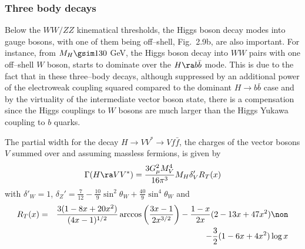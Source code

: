 \subsubsection{Three body decays} 

Below the $WW/ZZ$ kinematical thresholds, the Higgs boson decay modes into
gauge bosons, with one of them being off--shell, Fig.~2.9b, are also important.
For instance, from $M_{H}  \gsim 130$ GeV, the Higgs  boson decay into  $WW$
pairs with one off--shell $W$ boson, starts to dominate over the  $H \ra
b\bar{b}$ mode.  This is due to the fact that in these three--body decays,
although suppressed by an additional power of the  electroweak coupling squared
compared to the dominant $H \to b\bar{b}$ case and by the virtuality of the
intermediate vector boson state,  there is a compensation since the Higgs
couplings to $W$ bosons are much larger than the Higgs Yukawa coupling to $b$
quarks.\s

The partial width for the decay $H \to VV^* \to V f\bar{f}$, the charges of the
vector bosons $V$ summed over and assuming massless fermions, is given by 
\cite{HVV-3body}
\begin{eqnarray} 
\Gamma (H \ra VV^*) = \frac{3 G_\mu^2 M_V^4}{16 \pi^3} M_H \delta_V' R_T(x) 
\label{HVV-3body}
\end{eqnarray} 
with $\delta'_W=1$, $\delta_Z' = \frac{7}{12} - \frac{10}{9}
\sin^2\theta_W+ \frac{40}{9}\sin^4\theta_W$ and 
\begin{eqnarray}
R_T(x) & = & \frac{3(1-8x+20x^2)}{(4x-1)^{1/2}} \arccos \left( \frac{3x-1}
{2x^{3/2}} \right) -\frac{1-x}{2x} (2-13x+47x^2) \non \\ && 
- \frac{3}{2}(1-6x+4x^2) \log x 
\label{HVVrt}
\end{eqnarray}

